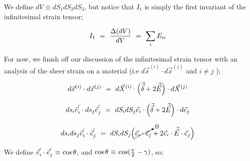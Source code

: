 \documentclass{article}
\begin{document}
We define \begin{math} dV \equiv  dS_1 dS_2 dS_3 \end{math}, but notice that \begin{math} I_1 \end{math} is simply the first invariant of the infinitesimal strain tensor;

\begin{equation} \label{eb-eq-1-94}
 I_1 \hspace{0.125cm} = \hspace{0.125cm}  \frac{\Delta ( dV )}{dV} \hspace{0.125cm} = \hspace{0.125cm} \sum_i E_{i i} 
\end{equation} 

For now, we finish off our discussion of the infinitesimal strain tensor with an analysis of the sheer strain on a material (i.e \begin{math} d \vec{x}^{( i )} \cdot d \vec{x}^{( j )}  \end{math} and \begin{math} i \neq j \end{math} );

\begin{equation} \label{eb-eq-1-95}
d \vec{x}^{( i )} \cdot d \vec{x}^{( j )} \hspace{0.125cm} = \hspace{0.125cm} d \vec{X}^{( i )} \cdot \Big( \vec{\vec{\delta}} + 2 \vec{\vec{E}} \Big) \cdot d \vec{X}^{( j )} 
\end{equation} 

\begin{equation} \label{eb-eq-1-96}
ds_i \vec{e}_i^{ '} \cdot ds_j \vec{e}_j^{ '} \hspace{0.125cm} = \hspace{0.125cm} dS_i dS_j \vec{e}_i \cdot \Big( \vec{\vec{\delta}} + 2 \vec{\vec{E}} \Big) \cdot d \vec{e}_j
\end{equation} 

\begin{equation} \label{eb-eq-1-97}
ds_i ds_j \vec{e}_i^{ '} \cdot \vec{e}_j^{ '} \hspace{0.125cm} = \hspace{0.125cm} dS_i dS_j \Big( \cancelto{0}{\vec{e}_i \cdot \vec{e}_j} + 2 \vec{e}_i \cdot \vec{\vec{E}} \cdot \vec{e}_j  \Big) 
\end{equation} 

We define \begin{math} \vec{e}_i^{ '} \cdot \vec{e}_j^{ '} \hspace{0.025cm} \equiv \hspace{0.025cm} \cos{\theta} \end{math}, and \begin{math} \cos{\theta} \hspace{0.025cm} \equiv \hspace{0.025cm} \cos(\frac{\pi}{2} - \gamma) \end{math}, so;
\end{document}
